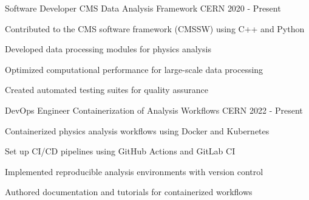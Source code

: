 \begin{cventries}
\cventry
{Software Developer} %
{CMS Data Analysis Framework} %
{CERN} %
{2020 - Present} %
{ %
\begin{cvitems}
\item {Contributed to the CMS software framework (CMSSW) using C++ and Python}
\item {Developed data processing modules for physics analysis}
\item {Optimized computational performance for large-scale data processing}
\item {Created automated testing suites for quality assurance}
\end{cvitems}
}


\cventry
{DevOps Engineer} %
{Containerization of Analysis Workflows} %
{CERN} %
{2022 - Present} %
{ %
\begin{cvitems}
\item {Containerized physics analysis workflows using Docker and Kubernetes}
\item {Set up CI/CD pipelines using GitHub Actions and GitLab CI}
\item {Implemented reproducible analysis environments with version control}
\item {Authored documentation and tutorials for containerized workflows}
\end{cvitems}
}


\end{cventries}
